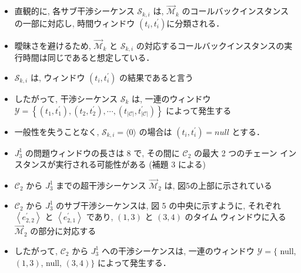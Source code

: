 \begin{frame}{}
    \begin{itemize}
        \item 直観的に, 各サブ干渉シーケンス $\mathcal{S}_{k, i}$ は, $\overrightarrow{\mathcal{M}}_{k}$ のコールバックインスタンスの一部に対応し, 時間ウィンドウ $\left(t_{i}, t_{i}^{\prime}\right)$に分類される．
        \item 曖昧さを避けるため, $\overrightarrow{\mathcal{M}}_{k}$ と $\mathcal{S}_{k, i}$ の対応するコールバックインスタンスの実行時間は同じであると想定している．
    \end{itemize}
\end{frame}

\begin{frame}{}
    \begin{itemize}
        \item $\mathcal{S}_{k, i}$ は, ウィンドウ $\left(t_{i}, t_{i}^{\prime}\right)$ の結果であると言う
        \item したがって, 干渉シーケンス $\mathcal{S}_{k}$ は, 一連のウィンドウ $\mathcal{Y}=\left\{\left(t_{1}, t_{1}^{\prime}\right),\left(t_{2}, t_{2}^{\prime}\right), \cdots,\left(t_{|\mathcal{C}|}, t_{|\mathcal{C}|}^{\prime}\right)\right\}$ によって発生する
        \item 一般性を失うことなく, $\mathcal{S}_{k, i}=\langle 0\rangle$ の場合は $\left(t_{i}, t_{i}^{\prime}\right)=n u l l$ とする．
    \end{itemize}
\end{frame}

\begin{frame}{}
\end{frame}

\begin{frame}{}
    \begin{itemize}
        \item $J_{3}^{1}$ の問題ウィンドウの長さは 8 で, その間に $\mathcal{C}_{2}$ の最大 2 つのチェーン インスタンスが実行される可能性がある (補題 3 による)
        \item $\mathcal{C}_{2}$ から $J_{3}^{1}$ までの超干渉シーケンス $\overrightarrow{\mathcal{M}}_{2}$ は, 図5の上部に示されている
        \item $\mathcal{C}_{2}$ から $J_{3}^{1}$ のサブ干渉シーケンスは, 図 5 の中央に示すように, それぞれ $\left\langle e_{2,2}^{\prime}\right\rangle$ と $\left\langle e_{2,1}^{\prime}\right\rangle$ であり, $(1,3)$ と $(3,4)$ のタイム ウィンドウに入る $\overrightarrow{\mathcal{M}}_{2}$ の部分に対応する
        \item したがって, $\mathcal{C}_{2}$ から $J_{3}^{1}$ への干渉シーケンスは, 一連のウィンドウ $\mathcal{Y}=\{$ null, $(1,3)$, null, $(3,4)\}$ によって発生する．
    \end{itemize}
\end{frame}

